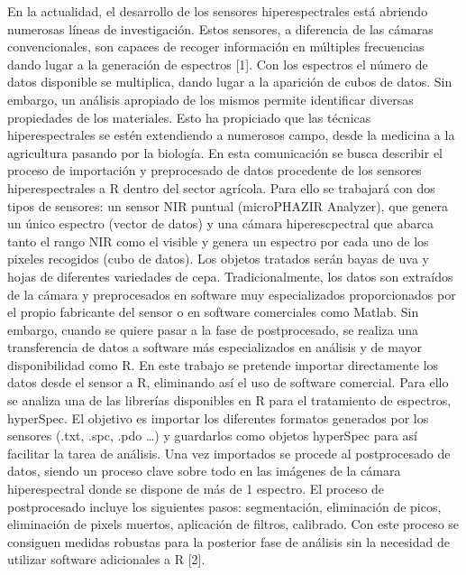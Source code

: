 En la actualidad, el desarrollo de los sensores hiperespectrales está abriendo numerosas líneas de investigación. Estos sensores, a diferencia de las cámaras convencionales, son capaces de recoger información en múltiples frecuencias dando lugar a la generación de espectros [1]. Con los espectros el número de datos disponible se multiplica, dando lugar a la aparición de cubos de datos. Sin embargo, un análisis apropiado de los mismos permite identificar diversas propiedades de los materiales. Esto ha propiciado que las técnicas hiperespectrales se estén extendiendo a numerosos campo, desde la medicina a la agricultura pasando por la biología.
En esta comunicación se busca describir el proceso de importación y preprocesado de datos procedente de los sensores hiperespectrales a R dentro del sector agrícola. Para ello se trabajará con dos tipos de sensores: un sensor NIR puntual (microPHAZIR Analyzer), que genera un único espectro (vector de datos) y una cámara hiperescpectral que abarca tanto el rango NIR como el visible y genera un espectro por cada uno de los pixeles recogidos (cubo de datos). Los objetos tratados serán bayas de uva y hojas de diferentes variedades de cepa.
Tradicionalmente, los datos son extraídos de la cámara y preprocesados en software muy especializados proporcionados por el propio fabricante del sensor o en software comerciales como Matlab. Sin embargo, cuando se quiere pasar a la fase de postprocesado, se realiza una transferencia de datos a software más especializados en análisis y de mayor disponibilidad como R. En este trabajo se pretende importar directamente los datos desde el sensor a R, eliminando así el uso de software comercial. Para ello se analiza una de las librerías disponibles en R para el tratamiento de espectros, hyperSpec. El objetivo es importar los diferentes formatos generados por los sensores (.txt, .spc, .pdo …) y guardarlos como objetos hyperSpec para así facilitar la tarea de análisis. Una vez importados se procede al postprocesado de datos, siendo un proceso clave sobre todo en las imágenes de la cámara hiperespectral donde se dispone de más de 1 espectro. El proceso de postprocesado incluye los siguientes pasos: segmentación, eliminación de picos, eliminación de pixels muertos, aplicación de filtros, calibrado. Con este proceso se consiguen medidas robustas para la posterior fase de análisis sin la necesidad de utilizar software adicionales a R [2].

%

%
